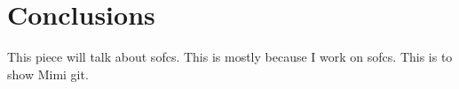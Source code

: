 


\chapter{Conclusions}

This piece will talk about \glspl{sofc}.
This is mostly because I work on \glspl{sofc}.
This is to show Mimi git.
